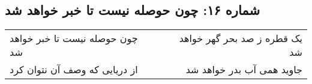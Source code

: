 \begin{center}
\section*{شماره ۱۶: چون حوصله نیست تا خبر خواهد شد}
\label{sec:016}
\begin{longtable}{l p{0.5cm} r}
چون حوصله نیست تا خبر خواهد شد
&&
یک قطره ز صد بحر گهر خواهد شد
\\
از دریایی که وصف آن نتوان کرد
&&
جاوید همی آب بدر خواهد شد
\\
\end{longtable}
\end{center}
